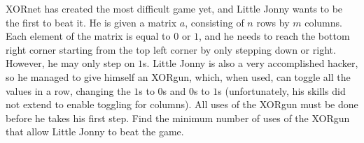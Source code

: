 XORnet has created the most difficult game yet, and Little Jonny wants to be the first to beat it. He is given a matrix $a$, consisting of $n$ rows by $m$ columns. Each element of the matrix is equal to $0$ or $1$, and he needs to reach the bottom right corner starting from the top left corner by only stepping down or right. However, he may only step on $1$s. Little Jonny is also a very accomplished hacker, so he managed to give himself an XORgun, which, when used, can toggle all the values in a row, changing the $1$s to $0$s and $0$s to $1$s (unfortunately, his skills did not extend to enable toggling for columns). All uses of the XORgun must be done before he takes his first step. Find the minimum number of uses of the XORgun that allow Little Jonny to beat the game.
